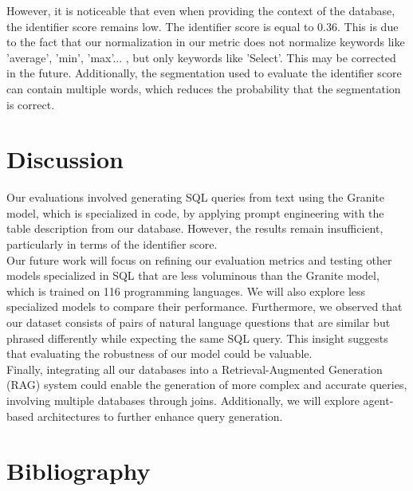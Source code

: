 \documentclass[12pt,a4paper]{article}
\begin{document}
However, it is noticeable that even when providing the context of the database, the identifier score remains low. The identifier score is equal to 0.36. This is due to the fact that our normalization in our metric does not normalize keywords like 'average', 'min', 'max'... ,  but only keywords like 'Select'. This may be corrected in the future. Additionally, the segmentation used to evaluate the identifier score can contain multiple words, which reduces the probability that the segmentation is correct. 



\section*{Discussion}

Our evaluations involved generating SQL queries from text using the Granite model, which is specialized in code, by applying prompt engineering with the table description from our database. However, the results remain insufficient, particularly in terms of the identifier score.\\

Our future work will focus on refining our evaluation metrics and testing other models specialized in SQL that are less voluminous than the Granite model, which is trained on 116 programming languages. We will also explore less specialized models to compare their performance.
Furthermore, we observed that our dataset consists of pairs of natural language questions that are similar but phrased differently while expecting the same SQL query. This insight suggests that evaluating the robustness of our model could be valuable.\\

Finally, integrating all our databases into a Retrieval-Augmented Generation (RAG) system could enable the generation of more complex and accurate queries, involving multiple databases through joins. Additionally, we will explore agent-based architectures to further enhance query generation.

\section*{Bibliography}


\end{document}
